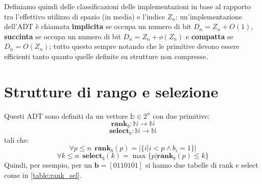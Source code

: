 Definiamo quindi delle classificazioni delle implementazioni in base al rapporto
tra l'effettivo utilizzo di spazio (in media) e l'indice $Z_n$:
un'implementazione dell'ADT è chiamata \textbf{implicita} se occupa un numero
di bit $D_n = Z_n + O(1)$, \textbf{succinta} se occupa un numero di bit
$D_n = Z_n + o(Z_n)$ e \textbf{compatta} se $D_n = O(Z_n)$; tutto questo sempre
notando che le primitive devono essere efficienti tanto quanto quelle definite
su strutture non compresse.

\section{Strutture di rango e selezione}
Questi ADT sono definiti da un vettore $\mathbb{b} \in 2^n$ con due primitive:
$$
	\mathbf{rank}_b: \mathbb{N} \rightarrow \mathbb{N}
$$
$$
	\mathbf{select}_b: \mathbb{N} \rightarrow \mathbb{N}
$$
tali che:
$$
	\forall p \leq n ~~ \mathbf{rank}_b(p) = |\{i | i < p \land b_i = 1\}|
$$
$$
	\forall k \leq n ~~ \mathbf{select}_b(k) =\max \{p | \mathbf{rank}_b(p) \leq k\}
$$
Quindi, per esempio, per un $\mathbf{b} = [0 1 1 0 1 0 1]$ si hanno due
tabelle di rank e select come in \cref{table:rank_sel}.

